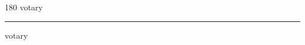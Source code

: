 
\begin{frame}
\begin{center}
\begin{turn}{180}
{\fontsize{2.5cm}{1em}\selectfont votary}
\end{turn}
\vspace{1em}\par  
\hrule
\vspace{1em}\par  
{\fontsize{2.5cm}{1em}\selectfont votary}
\end{center}
\end{frame}
